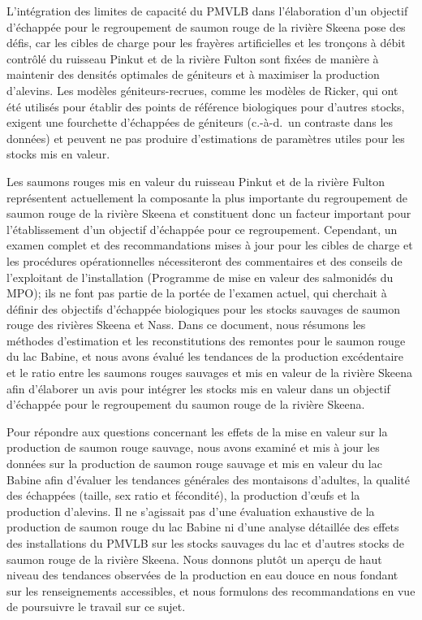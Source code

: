 \documentclass[french,11pt]{book}
\begin{document}
L'intégration des limites de capacité du PMVLB dans l'élaboration d'un objectif d'échappée pour le regroupement de saumon rouge de la rivière Skeena pose des défis, car les cibles de charge pour les frayères artificielles et les tronçons à débit contrôlé du ruisseau Pinkut et de la rivière Fulton sont fixées de manière à maintenir des densités optimales de géniteurs et à maximiser la production d'alevins. Les modèles géniteurs-recrues, comme les modèles de Ricker, qui ont été utilisés pour établir des points de référence biologiques pour d'autres stocks, exigent une fourchette d'échappées de géniteurs (c.-à-d.~un contraste dans les données) et peuvent ne pas produire d'estimations de paramètres utiles pour les stocks mis en valeur.

Les saumons rouges mis en valeur du ruisseau Pinkut et de la rivière Fulton représentent actuellement la composante la plus importante du regroupement de saumon rouge de la rivière Skeena et constituent donc un facteur important pour l'établissement d'un objectif d'échappée pour ce regroupement. Cependant, un examen complet et des recommandations mises à jour pour les cibles de charge et les procédures opérationnelles nécessiteront des commentaires et des conseils de l'exploitant de l'installation (Programme de mise en valeur des salmonidés du MPO); ils ne font pas partie de la portée de l'examen actuel, qui cherchait à définir des objectifs d'échappée biologiques pour les stocks sauvages de saumon rouge des rivières Skeena et Nass. Dans ce document, nous résumons les méthodes d'estimation et les reconstitutions des remontes pour le saumon rouge du lac Babine, et nous avons évalué les tendances de la production excédentaire et le ratio entre les saumons rouges sauvages et mis en valeur de la rivière Skeena afin d'élaborer un avis pour intégrer les stocks mis en valeur dans un objectif d'échappée pour le regroupement du saumon rouge de la rivière Skeena.

Pour répondre aux questions concernant les effets de la mise en valeur sur la production de saumon rouge sauvage, nous avons examiné et mis à jour les données sur la production de saumon rouge sauvage et mis en valeur du lac Babine afin d'évaluer les tendances générales des montaisons d'adultes, la qualité des échappées (taille, sex ratio et fécondité), la production d'œufs et la production d'alevins. Il ne s'agissait pas d'une évaluation exhaustive de la production de saumon rouge du lac Babine ni d'une analyse détaillée des effets des installations du PMVLB sur les stocks sauvages du lac et d'autres stocks de saumon rouge de la rivière Skeena. Nous donnons plutôt un aperçu de haut niveau des tendances observées de la production en eau douce en nous fondant sur les renseignements accessibles, et nous formulons des recommandations en vue de poursuivre le travail sur ce sujet.
\end{document}
